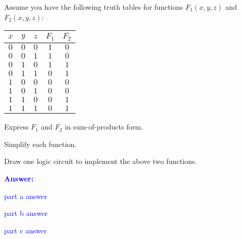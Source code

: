 \item{}
Assume you have the following truth tables for functions $F_1(x,y,z)$ and
$F_2(x,y,z)$:\\[6pt]
\begin{tabular}{ccc|cc}
    \hline
    {\bf $x$} & {\bf $y$} & {\bf $z$} & {\bf $F_1$} & {\bf $F_2$} \\ \hline\hline
    $0$ & $0$ & $0$ & $1$ & $0$ \\ \hline
    $0$ & $0$ & $1$ & $1$ & $0$ \\ \hline
    $0$ & $1$ & $0$ & $1$ & $1$ \\ \hline
    $0$ & $1$ & $1$ & $0$ & $1$ \\ \hline
    $1$ & $0$ & $0$ & $0$ & $0$ \\ \hline
    $1$ & $0$ & $1$ & $0$ & $0$ \\ \hline
    $1$ & $1$ & $0$ & $0$ & $1$ \\ \hline
    $1$ & $1$ & $1$ & $0$ & $1$ \\ \hline
\end{tabular}
\begin{list}{\textbf{}}{}
    \item Express $F_1$ and $F_2$ in sum-of-products form.
    \item Simplify each function.
    \item Draw one logic circuit to implement the above two functions.
\end{list}
\vskip12pt
\ifanswers
\textcolor{blue}{
\textbf{Answer:}\\
\begin{list}{\textbf{}}{}
    \item part a answer
    \item part b answer
    \item part c answer
\end{list}
}
\newpage
\fi
